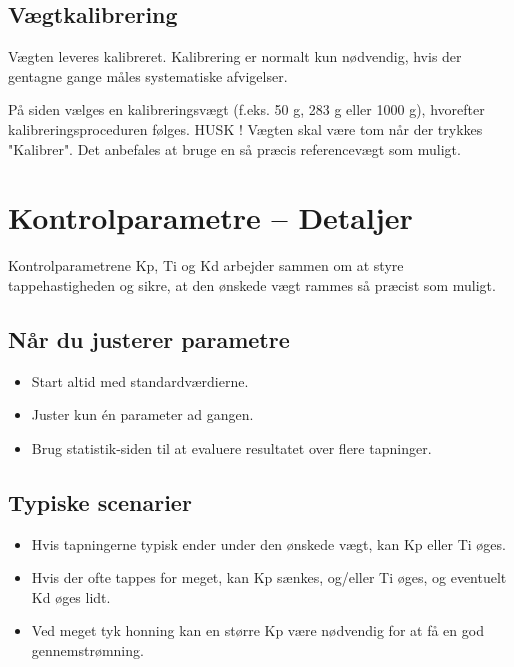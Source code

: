 \documentclass[11pt,a4paper]{article}
\begin{document}
\subsection{Vægtkalibrering}

Vægten leveres kalibreret. Kalibrering er normalt kun nødvendig, hvis der gentagne gange måles systematiske afvigelser.

På siden vælges en kalibreringsvægt (f.eks. 50 g, 283 g eller 1000 g), hvorefter kalibreringsproceduren følges. HUSK ! Vægten skal være tom når der trykkes "Kalibrer". Det anbefales at bruge en så præcis referencevægt som muligt.

\newpage

\section{Kontrolparametre – Detaljer}

Kontrolparametrene Kp, Ti og Kd arbejder sammen om at styre tappehastigheden og sikre, at den ønskede vægt rammes så præcist som muligt.

\subsection*{Når du justerer parametre}

\begin{itemize}[leftmargin=*]
    \item Start altid med standardværdierne.
    \item Juster kun én parameter ad gangen.
    \item Brug statistik-siden til at evaluere resultatet over flere tapninger.
\end{itemize}

\subsection*{Typiske scenarier}

\begin{itemize}[leftmargin=*]
    \item Hvis tapningerne typisk ender under den ønskede vægt, kan Kp eller Ti øges.
    \item Hvis der ofte tappes for meget, kan Kp sænkes, og/eller Ti øges, og eventuelt Kd øges lidt.
    \item Ved meget tyk honning kan en større Kp være nødvendig for at få en god gennemstrømning.
\end{itemize}
\end{document}
